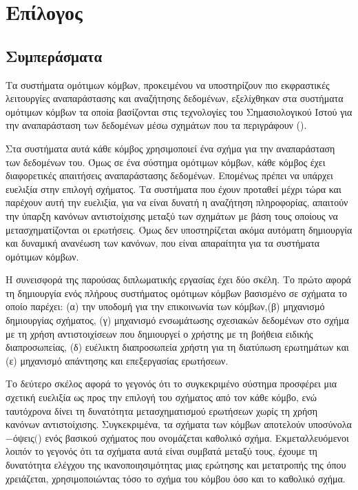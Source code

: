 \chapter{Επίλογος}

\section{Συμπεράσματα}
Τα συστήματα ομότιμων κόμβων, προκειμένου να υποστηρίζουν πιο
εκφραστικές λειτουργίες αναπαράστασης και αναζήτησης δεδομένων,
εξελίχθηκαν στα συστήματα ομότιμων κόμβων τα οποία βασίζονται στις
τεχνολογίες του Σημασιολογικού Ιστού για την αναπαράσταση των
δεδομένων μέσω σχημάτων που τα περιγράφουν ().

Στα συστήματα αυτά κάθε κόμβος χρησιμοποιεί ένα σχήμα για την
αναπαράσταση των δεδομένων του. Όμως σε ένα σύστημα ομότιμων
κόμβων, κάθε κόμβος έχει διαφορετικές απαιτήσεις αναπαράστασης
δεδομένων. Επομένως πρέπει να υπάρχει ευελιξία στην επιλογή
σχήματος. Τα συστήματα που έχουν προταθεί μέχρι τώρα και παρέχουν
αυτή την ευελιξία, για να είναι δυνατή η αναζήτηση πληροφορίας,
απαιτούν την ύπαρξη κανόνων αντιστοίχισης μεταξύ των σχημάτων με
βάση τους οποίους να μετασχηματίζονται οι ερωτήσεις. Όμως δεν
υποστηρίζεται ακόμα αυτόματη δημιουργία και δυναμική ανανέωση των
κανόνων, που είναι απαραίτητα για τα συστήματα ομότιμων κόμβων.

Η συνεισφορά της παρούσας διπλωματικής εργασίας έχει δύο σκέλη. Το
πρώτο αφορά τη δημιουργία ενός πλήρους συστήματος ομότιμων κόμβων
βασισμένο σε σχήματα  το οποίο παρέχει: (α) την υποδομή
για την επικοινωνία των κόμβων,(β) μηχανισμό δημιουργίας σχήματος,
(γ) μηχανισμό ενσωμάτωσης σχεσιακών δεδομένων στο σχήμα με τη
χρήση αντιστοιχίσεων που δημιουργεί ο χρήστης με τη βοήθεια
ειδικής διαπροσωπείας, (δ) ευέλικτη διαπροσωπεία χρήστη για τη
διατύπωση ερωτημάτων και (ε) μηχανισμό απάντησης και επεξεργασίας
ερωτήσεων.

Το δεύτερο σκέλος αφορά το γεγονός ότι το συγκεκριμένο σύστημα
προσφέρει μια σχετική ευελιξία ως προς την επιλογή του σχήματος
από τον κάθε κόμβο, ενώ ταυτόχρονα δίνει τη δυνατότητα
μετασχηματισμού ερωτήσεων χωρίς τη χρήση κανόνων αντιστοίχισης.
Συγκεκριμένα, τα σχήματα των κόμβων αποτελούν
υποσύνολα$-$όψεις$($) ενός βασικού σχήματος που
ονομάζεται καθολικό σχήμα. Εκμεταλλευόμενοι λοιπόν το γεγονός ότι
τα σχήματα αυτά είναι συμβατά μεταξύ τους, έχουμε τη δυνατότητα
ελέγχου της ικανοποιησιμότητας μιας ερώτησης και μετατροπής της
όπου χρειάζεται, χρησιμοποιώντας τόσο το σχήμα του κόμβου όσο και
το καθολικό σχήμα.

